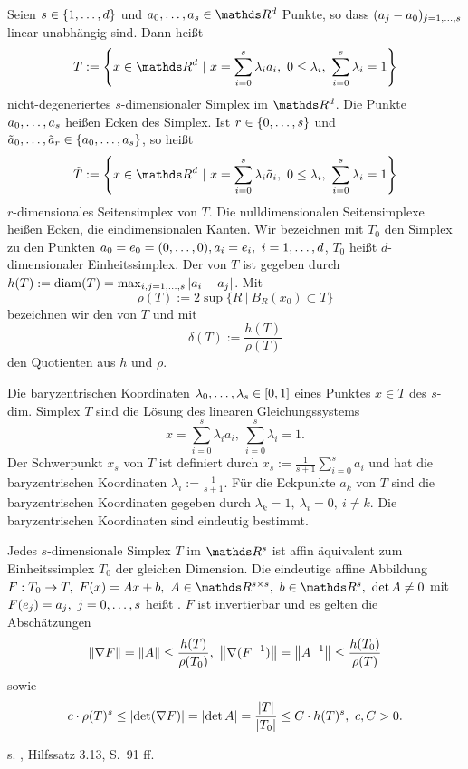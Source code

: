 Seien $s\in \left\{1, \dots ,d\right\}$ und $a_0\dt{,}a_s\in \R^d$ Punkte, so dass $(a_j-a_0)_{j=1, \dots ,s}$ linear unabhängig sind.
Dann heißt 
\[
T:= \penbrace{x\in \R^d~|~ x=\sum_{i=0}^{s}\lambda_ia_i,~0\le \lambda_i,~\sum_{i=0}^{s}\lambda_i=1}
\]
nicht-degeneriertes $s$-dimensionaler Simplex im $\R^d$.
Die Punkte $a_0, \dots ,a_s$ heißen Ecken des Simplex.
Ist $r\in \{0, \dots ,s\}$ und $\tilde{a}_0, \dots ,\tilde{a}_r\in \{a_0, \dots ,a_s\}$, so heißt
\[
\tilde{T}:= \penbrace{x\in \R^d~|~ x=\sum_{i=0}^{s}\lambda_i\tilde{a}_i,~0\le \lambda_i,~\sum_{i=0}^{s}\lambda_i=1}
\]
$r$-dimensionales Seitensimplex von $T$.
Die nulldimensionalen Seitensimplexe heißen Ecken, die eindimensionalen Kanten.
Wir bezeichnen mit $T_0$ den Simplex zu den Punkten $a_0=e_0=(0, \dots ,0),a_i = e_i,~i=1, \dots ,d$, $T_0$ heißt $d$-dimensionaler Einheitssimplex.
Der  von $T$ ist gegeben durch $h(T):= \operatorname{diam} (T) = \max_{i,j=1, \dots ,s}\left\vert a_i-a_j\right\vert$. 
Mit 
\[
\rho(T):= 2\sup\{R~|~B_R(x_0)\subset T\}
\]
bezeichnen wir den  von $T$ und mit 
\[
\delta(T):= \frac{h(T)}{\rho(T)}
\]
den Quotienten aus $h$ und $\rho$.

Die baryzentrischen Koordinaten $\lambda_0, \dots ,\lambda_s\in [0,1]$ eines Punktes $x\in T$ des $s$-dim. Simplex $T$ sind die Lösung des linearen Gleichungssystems
\[
x= \sum_{i=0}^{s}\lambda_i a_i,~ \sum_{i=0}^{s} \lambda_i =1.
\]
Der Schwerpunkt $x_s$ von $T$ ist definiert durch $x_s := \frac{1}{s+1}\sum_{i=0}^{s}a_i$ und hat die baryzentrischen Koordinaten $\lambda_i :=\frac{1}{s+1}$.
Für die Eckpunkte $a_k$ von $T$ sind die baryzentrischen Koordinaten gegeben durch $\lambda_k=1,~\lambda_i =0,~i\neq k$.
Die baryzentrischen Koordinaten sind eindeutig bestimmt.

Jedes $s$-dimensionale Simplex $T$ im $\R^s$ ist affin äquivalent zum Einheitssimplex $T_0$ der gleichen Dimension.
Die eindeutige affine Abbildung $F:T_0\to T, ~ F(x) =Ax+b,~A\in \R^{s\times s},~b\in \R^s, ~\det A \neq 0$ mit $F(e_j)= a_j,~j=0, \dots ,
s$ heißt .
$F$ ist invertierbar und es gelten die Abschätzungen
\[
\left\Vert\nabla F\right\Vert = \left\Vert A\right\Vert\le \frac{h(T)}{\rho(T_0)},~\left\Vert\nabla(F^{-1})\right\Vert= \left\Vert A^{-1}\right\Vert\le \frac{h(T_0)}{\rho(T)}
\]
sowie
\[
c\cdot \rho(T)^s \le \left\vert\det (\nabla F)\right\vert= \left\vert\det A\right\vert =\frac{\left\vert T\right\vert}{\left\vert T_0\right\vert}\le C\cdot h(T)^s,~c,C>0.
\]

 s. \cite{Dziuk10}, Hilfssatz 3.13, S.~91 ff.

